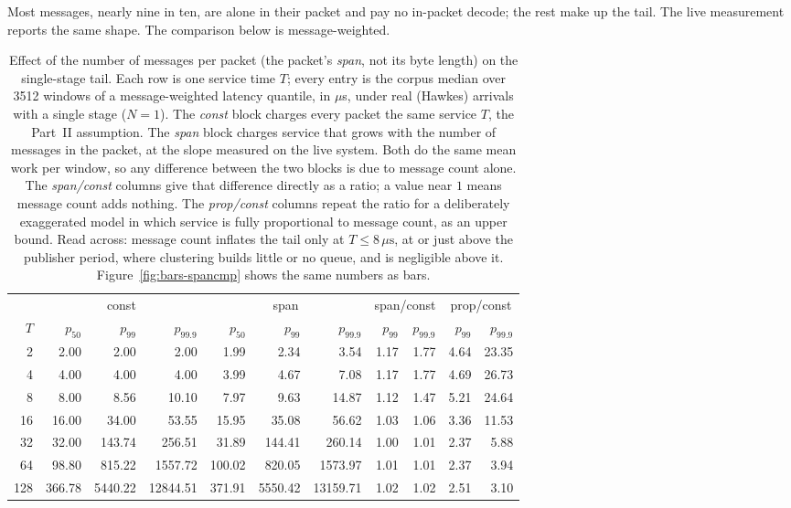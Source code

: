 \documentclass[11pt]{article}
\begin{document}
Most messages, nearly nine in ten, are alone in their packet and pay no in-packet decode;
the rest make up the tail. The live measurement reports the same shape. The comparison
below is message-weighted.

\begin{table}[H]
\centering
\small
\begin{tabular}{@{}r rrr rrr rr rr@{}}
\toprule
 & \multicolumn{3}{c}{const} & \multicolumn{3}{c}{span} &
   \multicolumn{2}{c}{span/const} & \multicolumn{2}{c}{prop/const} \\
\cmidrule(lr){2-4} \cmidrule(lr){5-7} \cmidrule(lr){8-9} \cmidrule(lr){10-11}
$T$ & $p_{50}$ & $p_{99}$ & $p_{99.9}$ & $p_{50}$ & $p_{99}$ & $p_{99.9}$ &
 $p_{99}$ & $p_{99.9}$ & $p_{99}$ & $p_{99.9}$ \\
\midrule
  2 &    2.00 &     2.00 &      2.00 &    1.99 &     2.34 &      3.54 & 1.17 & 1.77 &  4.64 & 23.35 \\
  4 &    4.00 &     4.00 &      4.00 &    3.99 &     4.67 &      7.08 & 1.17 & 1.77 &  4.69 & 26.73 \\
  8 &    8.00 &     8.56 &     10.10 &    7.97 &     9.63 &     14.87 & 1.12 & 1.47 &  5.21 & 24.64 \\
 16 &   16.00 &    34.00 &     53.55 &   15.95 &    35.08 &     56.62 & 1.03 & 1.06 &  3.36 & 11.53 \\
 32 &   32.00 &   143.74 &    256.51 &   31.89 &   144.41 &    260.14 & 1.00 & 1.01 &  2.37 &  5.88 \\
 64 &   98.80 &   815.22 &   1557.72 &  100.02 &   820.05 &   1573.97 & 1.01 & 1.01 &  2.37 &  3.94 \\
128 &  366.78 &  5440.22 &  12844.51 &  371.91 &  5550.42 &  13159.71 & 1.02 & 1.02 &  2.51 &  3.10 \\
\bottomrule
\end{tabular}
\caption{Effect of the number of messages per packet (the packet's \emph{span}, not its byte
length) on the single-stage tail. Each row is one service time
$T$; every entry is the corpus median over 3512 windows of a message-weighted latency
quantile, in $\mu$s, under real (Hawkes) arrivals with a single stage ($N = 1$). The
\emph{const} block charges every packet the same service $T$, the Part~II assumption.
The \emph{span} block charges service that grows with the number of messages in the
packet, at the slope measured on the live system. Both do the same mean work per window,
so any difference between the two blocks is due to message count alone. The
\emph{span/const} columns give that difference directly as a ratio; a value near $1$
means message count adds nothing. The \emph{prop/const} columns repeat the ratio for a
deliberately exaggerated model in which service is fully proportional to message count,
as an upper bound. Read across: message count inflates the tail only at $T \le
8\,\mu\mathrm{s}$, at or just above the publisher period, where clustering builds little
or no queue, and is negligible above it. Figure~\ref{fig:bars-spancmp} shows the same numbers as bars.}
\label{tab:spancmp}
\end{table}
\end{document}
